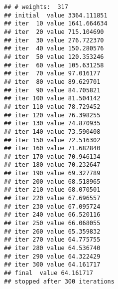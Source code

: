 \documentclass[
]{article}
\newenvironment{Shaded}{\begin{snugshade}}{\end{snugshade}}
\newcommand{\AttributeTok}[1]{\textcolor[rgb]{0.13,0.29,0.53}{#1}}
\newcommand{\DecValTok}[1]{\textcolor[rgb]{0.00,0.00,0.81}{#1}}
\newcommand{\FunctionTok}[1]{\textcolor[rgb]{0.13,0.29,0.53}{\textbf{#1}}}
\newcommand{\NormalTok}[1]{#1}
\newcommand{\OtherTok}[1]{\textcolor[rgb]{0.56,0.35,0.01}{#1}}
\newcommand{\SpecialCharTok}[1]{\textcolor[rgb]{0.81,0.36,0.00}{\textbf{#1}}}
\newcommand{\StringTok}[1]{\textcolor[rgb]{0.31,0.60,0.02}{#1}}
\begin{document}
\begin{verbatim}
## # weights:  317
## initial  value 3364.111851 
## iter  10 value 1641.664634
## iter  20 value 715.104690
## iter  30 value 276.722370
## iter  40 value 150.280576
## iter  50 value 120.353246
## iter  60 value 105.631258
## iter  70 value 97.016177
## iter  80 value 89.629701
## iter  90 value 84.705821
## iter 100 value 81.504142
## iter 110 value 78.729452
## iter 120 value 76.398255
## iter 130 value 74.870935
## iter 140 value 73.590408
## iter 150 value 72.516302
## iter 160 value 71.682840
## iter 170 value 70.946134
## iter 180 value 70.232647
## iter 190 value 69.327789
## iter 200 value 68.518965
## iter 210 value 68.070501
## iter 220 value 67.696557
## iter 230 value 67.095724
## iter 240 value 66.520116
## iter 250 value 66.068055
## iter 260 value 65.359832
## iter 270 value 64.775755
## iter 280 value 64.536740
## iter 290 value 64.322429
## iter 300 value 64.161717
## final  value 64.161717 
## stopped after 300 iterations
\end{verbatim}

\begin{Shaded}
\end{Shaded}
\end{document}
